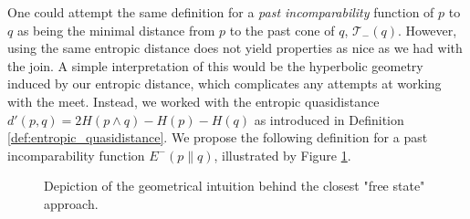 One could attempt the same definition for a \textit{past incomparability} function of $p$ to $q$ as being the minimal distance from $p$ to the past cone of $q$, $\mathcal{T}_-(q)$. However, using the same entropic distance does not yield properties as nice as we had with the join. A simple interpretation of this would be the hyperbolic geometry induced by our entropic distance, which complicates any attempts at working with the meet. Instead, we worked with the entropic quasidistance $d'(p, q) = 2H(p \wedge q) - H(p) - H(q)$ as introduced in Definition \ref{def:entropic_quasidistance}. We propose the following definition for a past incomparability function $E^-(p \parallel q)$, illustrated by Figure \ref{fig:past_closest_intuition}.

\begin{figure}[h!] %
    \centering
    \caption{Depiction of the geometrical intuition behind the closest "free state" approach.}
    \label{fig:past_closest_intuition}
\end{figure}

